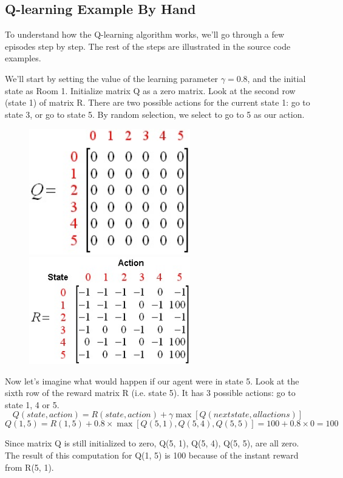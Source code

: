 \documentclass[a4paper, 11pt]{article}
\begin{document}
\subsection{Q-learning Example By Hand}
To understand how the Q-learning algorithm works, we'll go through a few episodes step by step. The rest of the steps are illustrated in the source code examples.

We'll start by setting the value of the learning parameter $\gamma=0.8$, and the initial state as Room 1. Initialize matrix Q as a zero matrix. Look at the second row (state 1) of matrix R.  There are two possible actions for the current state 1: go to state 3, or go to state 5. By random selection, we select to go to 5 as our action.

\begin{figure}[ht]
\centering
\includegraphics[width=7cm]{Pic/q_matrix1}
\quad
\includegraphics[width=7cm]{Pic/r_matrix1}
\end{figure}
Now let's imagine what would happen if our agent were in state 5.  Look at the sixth row of the reward matrix R (i.e. state 5).  It has 3 possible actions: go to state 1, 4 or 5.
$$Q(state, action) = R(state, action) + \gamma\max[Q(next state, all actions)]$$
$$Q(1, 5) = R(1, 5) + 0.8\times\max[Q(5, 1), Q(5, 4), Q(5, 5)] = 100 + 0.8\times 0 = 100$$

Since matrix Q is still initialized to zero, Q(5, 1), Q(5, 4), Q(5, 5), are all zero.  The result of this computation for Q(1, 5) is 100 because of the instant reward from R(5, 1).
\end{document}
